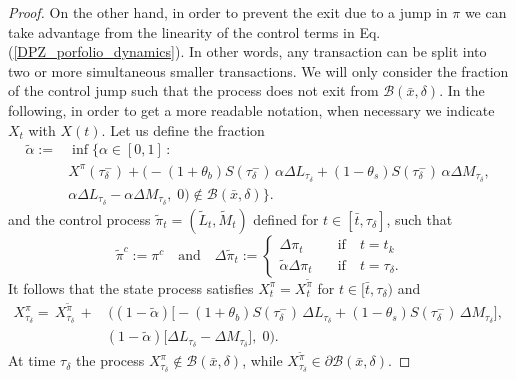 \begin{proof}
On the other hand, in order to prevent the exit due to a jump in $\pi$ we can take advantage from the linearity of the control terms in Eq. (\ref{DPZ_porfolio_dynamics}). 
In other words, any transaction can be split into two or more simultaneous smaller transactions.
We will only consider the fraction of the control jump such that the process does not exit from $\mathcal{B}(\bar x, \delta)$. 
In the following, in order to get a more readable notation, when necessary we indicate $X_t$ with $X(t)$.
Let us define the fraction
\begin{align}\label{c_bar}
 \tilde \alpha :=& \inf \biggl\{ \alpha \in [0,1] \, : \\ \nonumber
 & X^{\pi}(\tau_{\delta}^-) + \biggl( - (1+\theta_b) S(\tau_{\delta}^-)\, \alpha  \Delta L_{\tau_{\delta}} 
 + (1-\theta_s) S(\tau_{\delta}^-)\, \alpha \Delta M_{\tau_{\delta}}, \; \\ \nonumber
 & \alpha \Delta L_{\tau_{\delta}} - \alpha \Delta M_{\tau_{\delta}}, \; 0 \biggr)
 \not \in \mathcal{B}(\bar x, \delta) \biggr\}. 
\end{align}
and the control process $ \tilde \pi_t = (\tilde L_t, \tilde M_t)$ defined for $t \in [\bar t, \tau_{\delta}]$, such that
\begin{equation}
 \tilde \pi^c := \pi^c \quad \mbox{and} \quad
 \Delta \tilde \pi_t := \begin{cases}
                      \Delta \pi_t \quad &\mbox{if} \quad t = t_k \\
                      \tilde \alpha \Delta \pi_t \quad &\mbox{if} \quad t = \tau_{\delta}.  
                     \end{cases}
\end{equation}
It follows that the state process satisfies $X^{\pi}_t = X^{\tilde \pi}_t$ for $t \in [\bar t, \tau_{\delta} )$ and 
\begin{align*}
 X^{\pi}_{\tau_{\delta}} =\, X^{\tilde \pi}_{\tau_{\delta}} \, +& \, \biggl( (1-\tilde \alpha) \bigl[ - (1+\theta_b) S(\tau_{\delta}^-)\, \Delta L_{\tau_{\delta}} 
 + (1-\theta_s) S(\tau_{\delta}^-)\, \Delta M_{\tau_{\delta}} \bigr] , \; \\ \nonumber
& (1-\tilde \alpha) \bigl[ \Delta L_{\tau_{\delta}} - \Delta M_{\tau_{\delta}} \bigr], \; 0 \biggr). 
\end{align*}
At time $\tau_{\delta}$ the process $X^{\pi}_{\tau_{\delta}} \not \in \mathcal{B}(\bar x, \delta)$, while $X^{\tilde \pi}_{\tau_{\delta}} \in \partial \mathcal{B}(\bar x, \delta)$. 



\end{proof}
